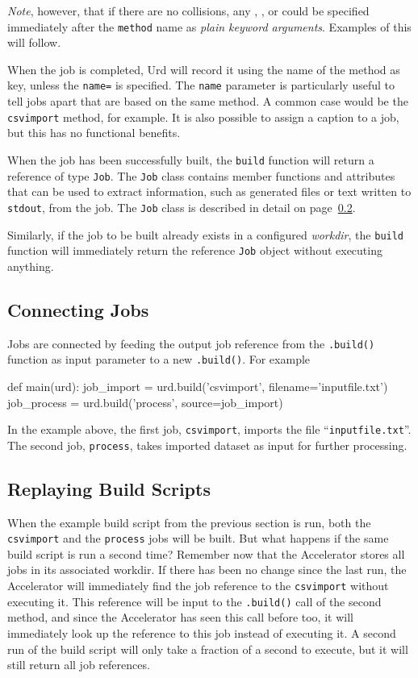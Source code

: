 \textsl{Note}, however, that  if there are no collisions, any \options, \datasets, or \jobs
could be specified immediately after the \texttt{method} name as \textsl{plain
keyword arguments}.  Examples of this will follow.

When the job is completed, Urd will record it using the name of the
method as key, unless the \texttt{name=} is specified.
The \texttt{name} parameter is particularly useful to tell jobs apart
that are based on the same method.  A common case would be
the \texttt{csvimport} method, for example.  It is also possible to
assign a caption to a job, but this has no functional benefits.

When the job has been successfully built, the \texttt{build} function
will return a reference of type \texttt{Job}.  The \texttt{Job} class
contains member functions and attributes that can be used to extract
information, such as generated files or text written
to \texttt{stdout}, from the job.  The \texttt{Job} class is described
in detail on page~\ref{}.

Similarly, if the job to be built already exists in a
configured \textsl{workdir}, the \texttt{build} function will
immediately return the reference \texttt{Job} object without executing
anything.



\subsection{Connecting Jobs}
Jobs are connected by feeding the output job reference from
the \texttt{.build()} function as input parameter to a
new \texttt{.build()}.  For example
\begin{python}
def main(urd):
    job_import  = urd.build('csvimport', filename='inputfile.txt')
    job_process = urd.build('process',   source=job_import)
\end{python}
In the example above, the first job, \texttt{csvimport}, imports the
file ``\texttt{inputfile.txt}''.  The second job, \texttt{process},
takes imported dataset as input for further processing.



\subsection{Replaying Build Scripts}

When the example build script from the previous section is run, both
the \texttt{csvimport} and the \texttt{process} jobs will be built.
But what happens if the same build script is run a second time?
Remember now that the Accelerator stores all jobs in its associated
workdir.  If there has been no change since the last run, the
Accelerator will immediately find the job reference to
the \texttt{csvimport} without executing it.  This reference will be
input to the \texttt{.build()} call of the second method, and since
the Accelerator has seen this call before too, it will immediately
look up the reference to this job instead of executing it.  A second
run of the build script will only take a fraction of a second to
execute, but it will still return all job references.

